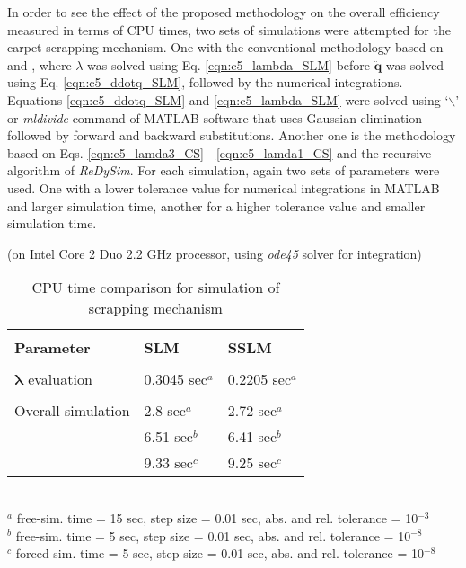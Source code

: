 {In order to see the effect of the proposed methodology on the overall efficiency measured in terms of CPU times, two sets of simulations were attempted for the carpet scrapping mechanism. One with the conventional methodology based on \citet{baumgarte1972stabilization} and \citet{blajer1994projective}, where \mbox{\boldmath$\lambda$} was solved using Eq. \ref{eqn:c5_lambda_SLM} before $\ddot{\textbf{q}}$ was solved using Eq. \ref{eqn:c5_ddotq_SLM}, followed by the numerical integrations. Equations \ref{eqn:c5_ddotq_SLM} and \ref{eqn:c5_lambda_SLM} were solved using `$\backslash$' or \emph{mldivide} command of MATLAB software that uses Gaussian elimination \citep{MATLAB_mldivide} followed by forward and backward substitutions. Another one is the methodology based on Eqs. \ref{eqn:c5_lamda3_CS} - \ref{eqn:c5_lamda1_CS} and the recursive algorithm of \emph{ReDySim}. For each simulation, again two sets of parameters were used. One with a lower tolerance value for numerical integrations in MATLAB and larger simulation time, another for a higher tolerance value and smaller simulation time.
\begin{table}[b!]
\centering
\caption{CPU time comparison for simulation of scrapping mechanism} 
{(on Intel Core 2 Duo 2.2 GHz processor, using \emph{ode45} solver for integration)}\\
	\label{tab3:simulation_time}
\begin{tabular}{l|ll}
			\hline\\
			\textbf{Parameter} & \textbf{SLM} & \textbf{SSLM} \\
			\hline\\
			$\bm\lambda$ evaluation & 0.3045 sec$^a$ & 0.2205 sec$^a$\\
			\hline\\
			Overall simulation & 2.8 sec$^a$ & 2.72 sec$^a$\\
			& 6.51 sec$^b$ & 6.41 sec$^b$\\
			& 9.33 sec$^c$ & 9.25 sec$^c$\\
			\hline
\end{tabular}\\
\vspace*{5pt}
$^{a}$ free-sim. time = 15 sec, step size = 0.01 sec, abs. and rel. tolerance = 10$^{-3}$\\
$^{b}$ free-sim. time = 5 sec, step size = 0.01 sec, abs. and rel. tolerance = 10$^{-8}$\\
$^{c}$ forced-sim. time = 5 sec, step size = 0.01 sec, abs. and rel. tolerance = 10$^{-8}$\\
\end{table}

}
